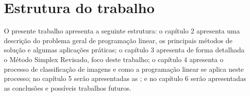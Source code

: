 \section{Estrutura do trabalho}
O presente trabalho apresenta a seguinte estrutura: o capítulo 2 apresenta uma descrição do problema geral de programação linear, os principais métodos de solução e algumas aplicações práticas; o capítulo 3 apresenta de forma detalhada o Método Simplex Revisado, foco deste trabalho; o capítulo 4 apresenta o processo de classificação de imagens e como a programação linear se aplica neste processo; no capítulo 5 serão apresentadas as ; e no capítulo 6 serão apresentadas as conclusões e possíveis trabalhos futuros. 
